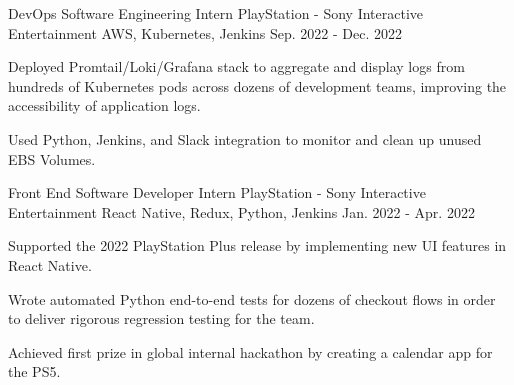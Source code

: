 

\begin{cventries}

  \cventry
    {DevOps Software Engineering Intern} %
    {PlayStation - Sony Interactive Entertainment} %
    {AWS, Kubernetes, Jenkins} %
    {Sep. 2022 - Dec. 2022} %
    {
      \begin{cvitems} %
        \item {Deployed Promtail/Loki/Grafana stack to aggregate and display logs from hundreds of Kubernetes pods across dozens of development teams, improving the accessibility of application logs.}
        \item {Used Python, Jenkins, and Slack integration to monitor and clean up unused EBS Volumes.}
      \end{cvitems}
    }

  \cventry
    {Front End Software Developer Intern} %
    {PlayStation - Sony Interactive Entertainment} %
    {React Native, Redux, Python, Jenkins} %
    {Jan. 2022 - Apr. 2022} %
    {
      \begin{cvitems} %
        \item {Supported the 2022 PlayStation Plus release by implementing new UI features in React Native.}
        \item {Wrote automated Python end-to-end tests for dozens of checkout flows in order to deliver rigorous regression testing for the team.} 
        \item {Achieved first prize in global internal hackathon by creating a calendar app for the PS5.}
      \end{cvitems}
    }



\end{cventries}
